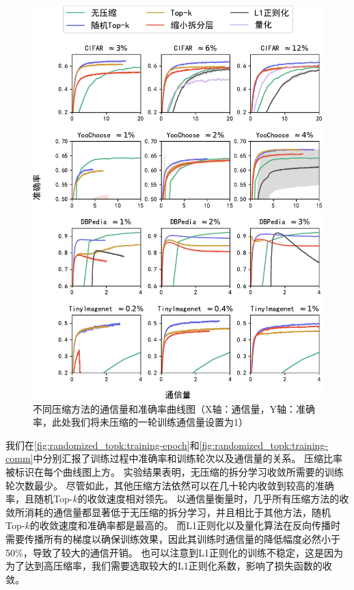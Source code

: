 \begin{figure}[h!]
    \centering
    \includegraphics[width=1\linewidth]{Z_Resources/randtopk_acc-comm}
    \caption{不同压缩方法的通信量和准确率曲线图（X轴：通信量，Y轴：准确率，此处我们将未压缩的一轮训练通信量设置为1）}
    \label{fig:randomized_topk:training-comm}
\end{figure}


我们在\autoref{fig:randomized_topk:training-epoch}和\autoref{fig:randomized_topk:training-comm}中分别汇报了训练过程中准确率和训练轮次以及通信量的关系。
压缩比率被标识在每个曲线图上方。
%
实验结果表明，无压缩的拆分学习收敛所需要的训练轮次数最少。
尽管如此，其他压缩方法依然可以在几十轮内收敛到较高的准确率，且随机Top-$k$的收敛速度相对领先。
%
以通信量衡量时，几乎所有压缩方法的收敛所消耗的通信量都显著低于无压缩的拆分学习，并且相比于其他方法，随机Top-$k$的收敛速度和准确率都是最高的。
%
而L1正则化以及量化算法在反向传播时需要传播所有的梯度以确保训练效果，因此其训练时通信量的降低幅度必然小于50\%，导致了较大的通信开销。
也可以注意到L1正则化的训练不稳定，这是因为为了达到高压缩率，我们需要选取较大的L1正则化系数，影响了损失函数的收敛。
%


